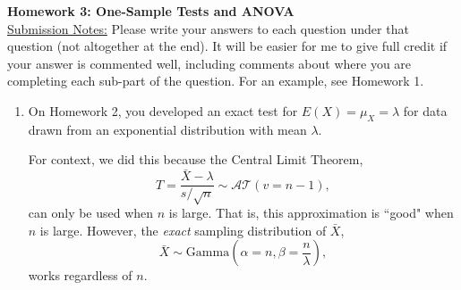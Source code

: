 \documentclass{article}\usepackage[]{graphicx}\usepackage[]{xcolor}
\begin{document}
\noindent\textbf{Homework 3: One-Sample Tests and ANOVA}\\
\noindent\makebox[\linewidth]{\rule{\textwidth}{0.4pt}}
\noindent\underline{Submission Notes:} Please write your answers to each 
question under that question (not altogether at the end). It will be easier for 
me to give full credit if your answer is commented well, including comments 
about where you are completing each sub-part of the question. For an example,
see Homework 1.\\
\noindent\makebox[\linewidth]{\rule{\textwidth}{0.4pt}}

\begin{enumerate}
\item On Homework 2, you developed an exact test for $E(X)=\mu_X=\lambda$
for data drawn from an exponential distribution with mean $\lambda$.

For context, we did this because the Central Limit Theorem,
\[T = \frac{\bar{X}-\lambda}{s/\sqrt{n}} \sim \mathcal{AT}(v=n-1),\]
can only be used when $n$ is large. That is, this approximation is 
``good" when $n$ is large. However, the \emph{exact} sampling distribution 
of $\bar{X}$,
\[\bar{X} \sim \textrm{Gamma}\left(\alpha=n, \beta=\frac{n}{\lambda}\right),\]
works regardless of $n$.


\end{enumerate}
\end{document}
